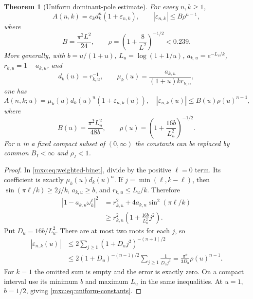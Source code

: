 \documentclass[11pt]{article}
\numberwithin{equation}{section}
\newtheorem{theorem}{Theorem}[section]
\theoremstyle{definition}
\theoremstyle{remark}
\begin{document}
\begin{theorem}[Uniform dominant-pole estimate]\label{mxc:thm:uniform}
For every $n,k\ge1$,
\begin{equation}\label{mxc:eq:uniform}
 A(n,k)=c_kd_k^n(1+\varepsilon_{n,k}),\qquad
 |\varepsilon_{n,k}|\le B\rho^{n-1},
\end{equation}
where
\begin{equation}\label{mxc:eq:uniform-constants}
 B=\frac{\pi^2L^2}{24},\qquad
 \rho=\left(1+\frac8{L^2}\right)^{-1/2}<0.239.
\end{equation}
More generally, with $b=u/(1+u)$, $L_u=\log(1+1/u)$,
$a_{k,u}=e^{-L_u/k}$, $r_{k,u}=1-a_{k,u}$, and
\[
 d_k(u)=r_{k,u}^{-1},\qquad
 \mu_k(u)=\frac{a_{k,u}}{(1+u)k r_{k,u}},
\]
one has
\begin{equation}\label{mxc:eq:weighted-uniform}
 A(n,k;u)=\mu_k(u)d_k(u)^n(1+\varepsilon_{n,k}(u)),
 \quad |\varepsilon_{n,k}(u)|\le B(u)\rho(u)^{n-1},
\end{equation}
where
\[
 B(u)=\frac{\pi^2L_u^2}{48b},\qquad
 \rho(u)=\left(1+\frac{16b}{L_u^2}\right)^{-1/2}.
\]
For $u$ in a fixed compact subset of $(0,\infty)$ the constants can
be replaced by common $B_I<\infty$ and $\rho_I<1$.
\end{theorem}
\begin{proof}
In \eqref{mxc:eq:weighted-binet}, divide by the positive $\ell=0$ term.
Its coefficient is exactly $\mu_k(u)d_k(u)^n$. If
$j=\min(\ell,k-\ell)$, then $\sin(\pi\ell/k)\ge2j/k$,
$a_{k,u}\ge b$, and $r_{k,u}\le L_u/k$. Therefore
\begin{align*}
 |1-a_{k,u}\omega_k^\ell|^2
 &=r_{k,u}^2+4a_{k,u}\sin^2(\pi\ell/k)\\
 &\ge r_{k,u}^2\left(1+\frac{16b}{L_u^2}j^2\right).
\end{align*}
Put $D_u=16b/L_u^2$. There are at most two roots for each $j$, so
\begin{align*}
 |\varepsilon_{n,k}(u)|
 &\le2\sum_{j\ge1}(1+D_u j^2)^{-(n+1)/2}\\
 &\le2(1+D_u)^{-(n-1)/2}\sum_{j\ge1}\frac1{D_u j^2}
 =\frac{\pi^2}{3D_u}\rho(u)^{n-1}.
\end{align*}
For $k=1$ the omitted sum is empty and the error is exactly zero.
On a compact interval use its minimum $b$ and maximum $L_u$ in the
same inequalities. At $u=1$, $b=1/2$, giving
\eqref{mxc:eq:uniform-constants}.
\end{proof}
\end{document}
